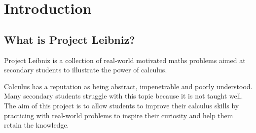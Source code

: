 \section{Introduction}
\subsection{What is Project Leibniz?}

Project Leibniz is a collection of real-world motivated maths problems aimed at
secondary students to illustrate the power of calculus.

Calculus has a reputation as being abstract, impenetrable and poorly
understood. Many secondary students struggle with this topic because it is not
taught well. The aim of this project is to allow students to improve their
calculus skills by practicing with real-world problems to inspire their
curiosity and help them retain the knowledge.
